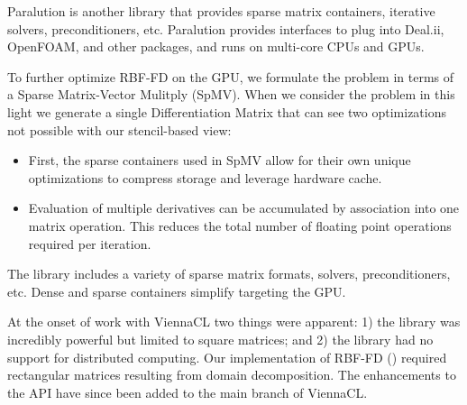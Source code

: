 \documentclass{report}
\begin{document}
Paralution is another library that provides sparse matrix containers, iterative solvers, preconditioners, etc. Paralution provides interfaces to plug into Deal.ii, OpenFOAM, and other packages, and runs on multi-core CPUs and GPUs. 


To further optimize RBF-FD on the GPU, we formulate the problem in terms of a Sparse Matrix-Vector Mulitply (SpMV). When we consider the problem in this light we generate a single Differentiation Matrix that can see two optimizations not possible with our stencil-based view: 
\begin{itemize} 
\item First, the sparse containers used in SpMV allow for their own unique optimizations to compress storage and leverage hardware cache.
\item Evaluation of multiple derivatives can be accumulated by association into one matrix operation. This reduces the total number of floating point operations required per iteration. 
\end{itemize}


The library includes a variety of sparse matrix formats, solvers, preconditioners, etc. Dense and sparse containers simplify targeting the GPU. 

At the onset of work with ViennaCL two things were apparent: 1) the library was incredibly powerful but limited to square matrices; and 2) the library had no support for distributed computing. Our implementation of RBF-FD (\cite{BolligRBFFDCode}) required rectangular matrices resulting from domain decomposition. The enhancements to the API have since been added to the main branch of ViennaCL. 


\end{document}
